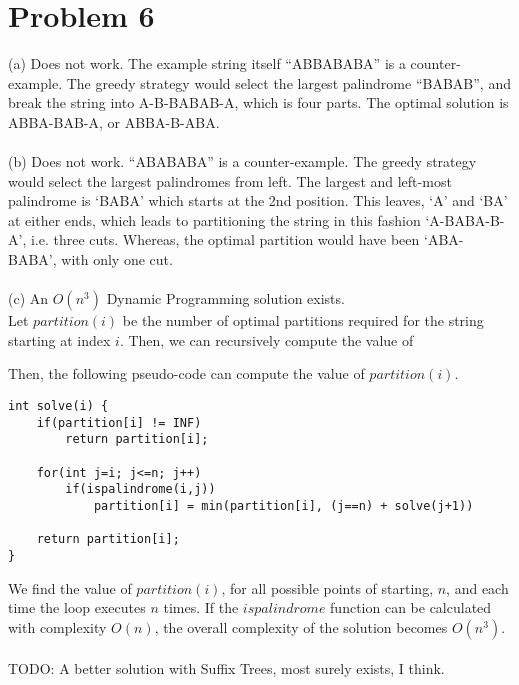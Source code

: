 \documentclass{article}
\begin{document}
\section{Problem 6}
(a) Does not work. The example string itself “ABBABABA” is a 
counter-example. The greedy strategy would select the largest 
palindrome “BABAB”, and break the string into A-B-BABAB-A, 
which is four parts. The optimal solution is ABBA-BAB-A, or ABBA-B-ABA.\\
\\
(b) Does not work. “ABABABA” is a counter-example. The greedy strategy 
would select the largest palindromes from left. The largest and left-most
palindrome is `BABA' which starts at the 2nd position. This leaves, `A' and
`BA' at either ends, which leads to partitioning the string in this fashion
`A-BABA-B-A', i.e. three cuts. Whereas, the optimal partition would have
been `ABA-BABA', with only one cut.\\
\\
(c) An {$ O(n^3) $} Dynamic Programming solution exists.\\
Let $partition(i)$ be the number of optimal partitions required for the string starting at index $i$. Then, we can recursively compute the value of 

Then, the following pseudo-code can compute the value of $partition(i)$.
\begin{verbatim}
int solve(i) {
    if(partition[i] != INF) 
        return partition[i];
		
    for(int j=i; j<=n; j++)
        if(ispalindrome(i,j))
            partition[i] = min(partition[i], (j==n) + solve(j+1))
    
    return partition[i];
}
\end{verbatim}
We find the value of $partition(i)$, for all possible points of starting, $n$, and each time the loop executes $n$ times. If the $ispalindrome$ function can be calculated with complexity $O(n)$, the overall complexity of the solution becomes $O(n^3)$.\\
\\
TODO: A better solution with Suffix Trees, most surely exists, I think.
\clearpage
\end{document}
